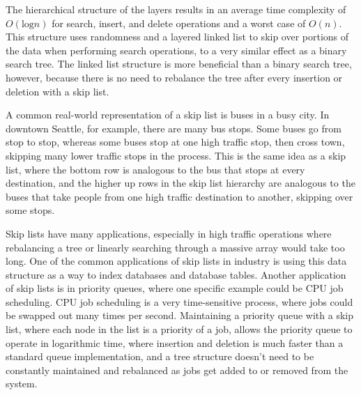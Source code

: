 \documentclass{article}
\begin{document}
The hierarchical structure of the layers results in an average time complexity of $O(\text{log} n)$ for search, insert, and delete operations and a worst case of $O(n)$. This structure uses randomness and a layered linked list to skip over portions of the data when performing search operations, to a very similar effect as a binary search tree. The linked list structure is more beneficial than a binary search tree, however, because there is no need to rebalance the tree after every insertion or deletion with a skip list.

A common real-world representation of a skip list is buses in a busy city. In downtown Seattle, for example, there are many bus stops. Some buses go from stop to stop, whereas some buses stop at one high traffic stop, then cross town, skipping many lower traffic stops in the process. This is the same idea as a skip list, where the bottom row is analogous to the bus that stops at every destination, and the higher up rows in the skip list hierarchy are analogous to the buses that take people from one high traffic destination to another, skipping over some stops. 

Skip lists have many applications, especially in high traffic operations where rebalancing a tree or linearly searching through a massive array would take too long. One of the common applications of skip lists in industry is using this data structure as a way to index databases and database tables. Another application of skip lists is in priority queues, where one specific example could be CPU job scheduling. CPU job scheduling is a very time-sensitive process, where jobs could be swapped out many times per second. Maintaining a priority queue with a skip list, where each node in the list is a priority of a job, allows the priority queue to operate in logarithmic time, where insertion and deletion is much faster than a standard queue implementation, and a tree structure doesn’t need to be constantly maintained and rebalanced as jobs get added to or removed from the system.



\pagebreak
\end{document}
